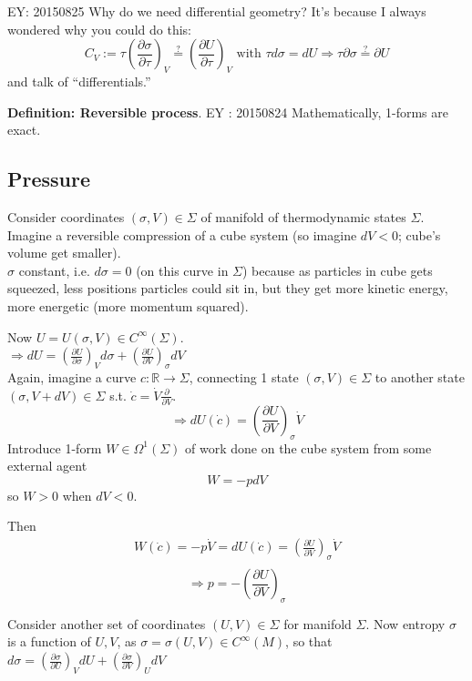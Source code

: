 EY: 20150825 Why do we need differential geometry? It's because I always wondered why you could do this:
\[
C_V := \tau \left( \frac{ \partial \sigma }{ \partial \tau} \right)_V \overset{?}{=} \left( \frac{ \partial U}{ \partial \tau} \right)_V \text{ with } \tau d\sigma = dU \Longrightarrow \tau \partial \sigma \overset{?}{=} \partial U
\]
and talk of ``differentials.''  

\textbf{Definition: Reversible process}.  EY : 20150824 Mathematically, 1-forms are exact.

\subsection*{Pressure}

Consider coordinates $(\sigma,V)\in \Sigma$ of manifold of thermodynamic states $\Sigma$.  \\
Imagine a reversible compression of a cube system (so imagine $dV<0$; cube's volume get smaller).  \\
$\sigma$ constant, i.e. $d\sigma =0$ (on this curve in $\Sigma$) because as particles in cube gets squeezed, less positions particles could sit in, but they get more kinetic energy, more energetic (more momentum squared).  

Now $U= U(\sigma,V) \in C^{\infty}(\Sigma)$.  \\
$\Longrightarrow dU = \left( \frac{\partial U}{ \partial \sigma} \right)_V d\sigma + \left( \frac{ \partial U}{ \partial V} \right)_{\sigma} dV$  \\
Again, imagine a curve $c: \mathbb{R}\to \Sigma$, connecting 1 state $(\sigma,V) \in \Sigma$ to another state $(\sigma, V+dV) \in \Sigma$ s.t. $\dot{c} = \dot{V} \frac{ \partial }{ \partial V}$.  
\[
\Longrightarrow dU(\dot{c}) = \left( \frac{ \partial U}{ \partial V} \right)_{\sigma}\dot{V}
\]
Introduce 1-form $W \in \Omega^1(\Sigma)$ of work done on the cube system from some external agent
\[
W = -pdV
\]
so $W >0$ when $dV <0$.  

Then
\[
\begin{gathered}
W(\dot{c}) = -p \dot{V} = dU(\dot{c}) = \left( \frac{ \partial U}{ \partial V} \right)_{\sigma} \dot{V} \\
\end{gathered}
\]
\begin{equation}
\Longrightarrow \boxed{ p = - \left( \frac{ \partial U}{ \partial V} \right)_{\sigma} }
\end{equation}

Consider another set of coordinates $(U,V) \in \Sigma$ for manifold $\Sigma$.  Now entropy $\sigma$ is a function of $U,V$, as $\sigma = \sigma(U,V) \in C^{\infty}(M)$, so that \\
$d\sigma = \left( \frac{ \partial \sigma}{ \partial U} \right)_V dU + \left( \frac{ \partial \sigma}{ \partial V} \right)_U dV$


